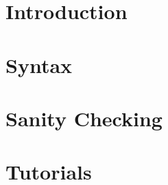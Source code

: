 \documentclass{report}[10pt]
\begin{document}
\sloppypar





\tableofcontents

\chapter{Introduction}
\label{Introduction}


\chapter{Syntax}
\label{Syntax}



\chapter{Sanity Checking}
\label{Sanity}


\chapter{Tutorials}
\label{Examples}






\newpage

\cleardoublepage

\printindex[com]
\printindex[var]
\printindex
\end{document}
